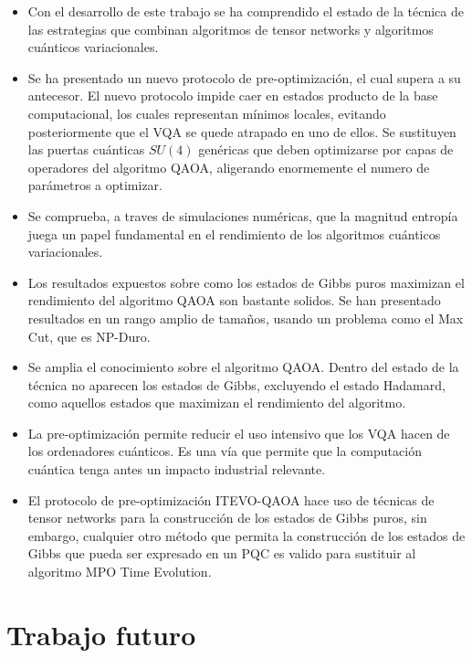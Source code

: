 \begin{itemize}

\item Con el desarrollo de este trabajo se ha comprendido el estado de la técnica de las estrategias que combinan algoritmos de tensor networks y algoritmos cuánticos variacionales.

\item Se ha presentado un nuevo protocolo de pre-optimización, el cual supera a su antecesor. El nuevo protocolo impide caer en estados producto de la base computacional, los cuales representan mínimos locales, evitando posteriormente que el VQA se quede atrapado en uno de ellos. Se sustituyen las puertas cuánticas $SU(4)$ genéricas que deben optimizarse por capas de operadores del algoritmo QAOA, aligerando enormemente el numero de parámetros a optimizar.

\item Se comprueba, a traves de simulaciones numéricas, que la magnitud entropía juega un papel fundamental en el rendimiento de los algoritmos cuánticos variacionales.

\item Los resultados expuestos sobre como los estados de Gibbs puros maximizan el rendimiento del algoritmo QAOA son bastante solidos. Se han presentado resultados en un rango amplio de tamaños, usando un problema como el Max Cut, que es NP-Duro.

\item Se amplia el conocimiento sobre el algoritmo QAOA. Dentro del estado de la técnica no aparecen los estados de Gibbs, excluyendo el estado Hadamard, como aquellos estados que maximizan el rendimiento del algoritmo. 

\item La pre-optimización permite reducir el uso intensivo que los VQA hacen de los ordenadores cuánticos. Es una vía que permite que la computación cuántica tenga antes un impacto industrial relevante.

\item El protocolo de pre-optimización ITEVO-QAOA hace uso de técnicas de tensor networks para la construcción de los estados de Gibbs puros, sin embargo, cualquier otro método que permita la construcción de los estados de Gibbs que pueda ser expresado en un PQC es valido para sustituir al algoritmo MPO Time Evolution.

\end{itemize}

\section{Trabajo futuro}

